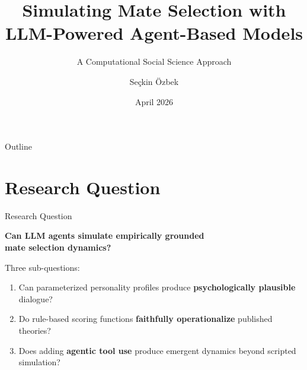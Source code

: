 \documentclass[aspectratio=169, 11pt]{beamer}
\title{Simulating Mate Selection with LLM-Powered Agent-Based Models}
\subtitle{A Computational Social Science Approach}
\author{Se\c{c}kin \"Ozbek}
\date{April 2026}
\institute{}
\begin{document}
\maketitle

\begin{frame}{Outline}
\tableofcontents
\end{frame}

\section{Research Question}

\begin{frame}{Research Question}
\begin{center}
\Large\textbf{Can LLM agents simulate empirically grounded\\mate selection dynamics?}
\end{center}

\vspace{1em}

Three sub-questions:
\begin{enumerate}
    \item Can parameterized personality profiles produce \textbf{psychologically plausible} dialogue?
    \item Do rule-based scoring functions \textbf{faithfully operationalize} published theories?
    \item Does adding \textbf{agentic tool use} produce emergent dynamics beyond scripted simulation?
\end{enumerate}
\end{frame}
\end{document}
